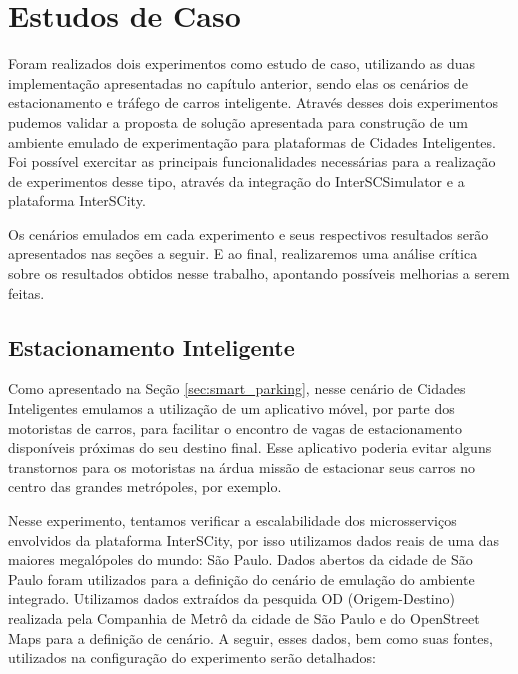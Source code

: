 \chapter{Estudos de Caso}
\label{cap:estudos-de-caso}


Foram realizados dois experimentos como estudo de caso, utilizando as duas implementação apresentadas no capítulo anterior, sendo elas os cenários de estacionamento e tráfego de carros inteligente.
Através desses dois experimentos pudemos validar a proposta de solução apresentada para construção de um ambiente emulado de experimentação para plataformas de Cidades Inteligentes.
Foi possível exercitar as principais funcionalidades necessárias para a realização de experimentos desse tipo, através da integração do InterSCSimulator e a plataforma InterSCity.

Os cenários emulados em cada experimento e seus respectivos resultados serão apresentados nas seções a seguir.
E ao final, realizaremos uma análise crítica sobre os resultados obtidos nesse trabalho, apontando possíveis melhorias a serem feitas.

\section{Estacionamento Inteligente}
\label{sec:exp_smart_parking}

Como apresentado na Seção \ref{sec:smart_parking}, nesse cenário de Cidades Inteligentes emulamos a utilização de um aplicativo móvel, por parte dos motoristas de carros, para facilitar o encontro de
vagas de estacionamento disponíveis próximas do seu destino final.
Esse aplicativo poderia evitar alguns transtornos para os motoristas na árdua missão de estacionar seus carros no centro das grandes metrópoles, por exemplo.

Nesse experimento, tentamos verificar a escalabilidade dos microsserviços envolvidos da plataforma InterSCity, por isso utilizamos dados reais de uma das maiores megalópoles do mundo: São Paulo.
Dados abertos da cidade de São Paulo foram utilizados para a definição do cenário de emulação do ambiente integrado.
Utilizamos dados extraídos da pesquida OD (Origem-Destino) realizada pela Companhia de Metrô da cidade de São Paulo e do OpenStreet Maps para a definição de cenário.
A seguir, esses dados, bem como suas fontes, utilizados na configuração do experimento serão detalhados:

